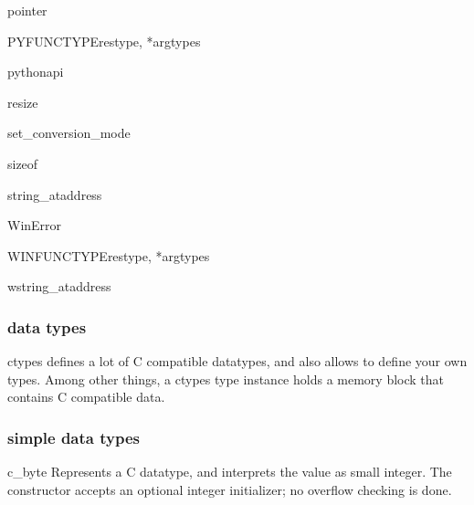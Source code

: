 \begin{funcdesc}{pointer}{}
\end{funcdesc}

\begin{funcdesc}{PYFUNCTYPE}{restype, *argtypes}
\end{funcdesc}

\begin{funcdesc}{pythonapi}{}
\end{funcdesc}

\begin{funcdesc}{resize}{}
\end{funcdesc}

\begin{funcdesc}{set_conversion_mode}{}
\end{funcdesc}

\begin{funcdesc}{sizeof}{}
\end{funcdesc}

\begin{funcdesc}{string_at}{address}
\end{funcdesc}

\begin{funcdesc}{WinError}{}
\end{funcdesc}

\begin{funcdesc}{WINFUNCTYPE}{restype, *argtypes}
\end{funcdesc}

\begin{funcdesc}{wstring_at}{address}
\end{funcdesc}

\subsubsection{data types}

ctypes defines a lot of C compatible datatypes, and also allows to
define your own types.  Among other things, a ctypes type instance
holds a memory block that contains C compatible data.

\subsubsection{simple data types}

\begin{classdesc}{c_byte}{}
Represents a C  datatype, and interprets the value
as small integer.  The constructor accepts an optional integer
initializer; no overflow checking is done.
\end{classdesc}

